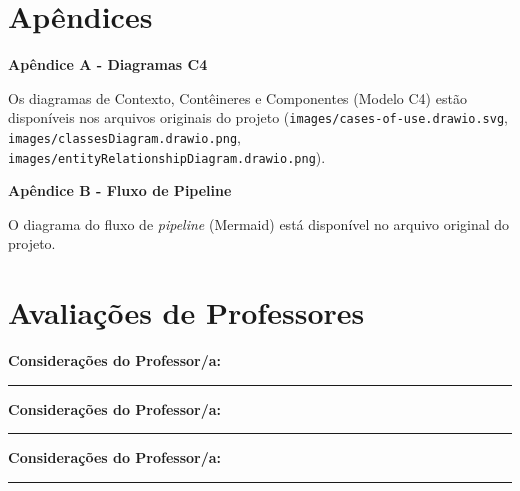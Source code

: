 \documentclass[12pt, a4paper]{article}
\begin{document}
\section{Apêndices}
\begin{spacing}{1.5}
\textbf{Apêndice A - Diagramas C4}

Os diagramas de Contexto, Contêineres e Componentes (Modelo C4) estão disponíveis nos arquivos originais do projeto (\texttt{images/cases-of-use.drawio.svg}, \texttt{images/classesDiagram.drawio.png}, \texttt{images/entityRelationshipDiagram.drawio.png}).

\textbf{Apêndice B - Fluxo de Pipeline}

O diagrama do fluxo de \textit{pipeline} (Mermaid) está disponível no arquivo original do projeto.
\end{spacing}

\section{Avaliações de Professores}
\begin{spacing}{1.5}
\textbf{Considerações do Professor/a:}

\vspace{5cm}

\rule{0.5\textwidth}{0.4pt}

\vspace{1cm}

\textbf{Considerações do Professor/a:}

\vspace{5cm}

\rule{0.5\textwidth}{0.4pt}

\vspace{1cm}

\textbf{Considerações do Professor/a:}

\vspace{5cm}

\rule{0.5\textwidth}{0.4pt}
\end{spacing}
\end{document}
